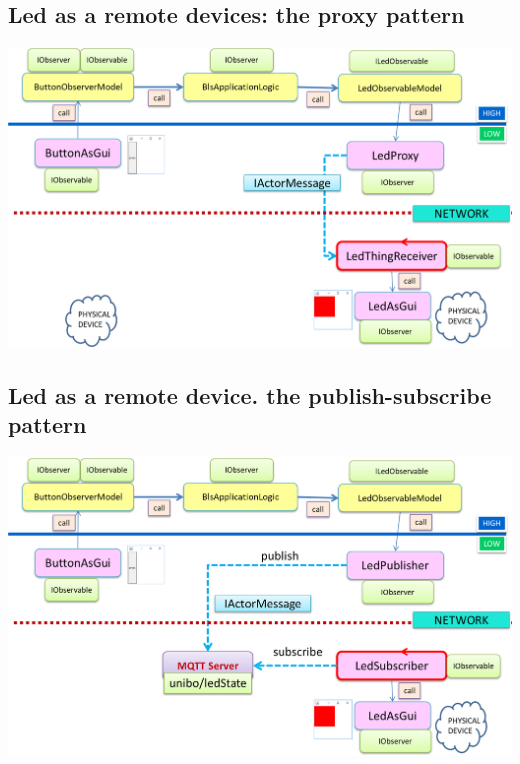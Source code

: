 \documentclass[10pt,a4paper,openright,twoside]{../llncs}
\begin{document}
\subsection{Led as a remote devices: the proxy pattern }

\medskip 
\includegraphics[scale = 0.5]{img/bls18/bls18ObjLedRemote.png}


\subsection{Led as a remote device. the publish-subscribe pattern }

\medskip 
\includegraphics[scale = 0.5]{img/bls18/bls18ObjLedMqtt.png}
\end{document}
